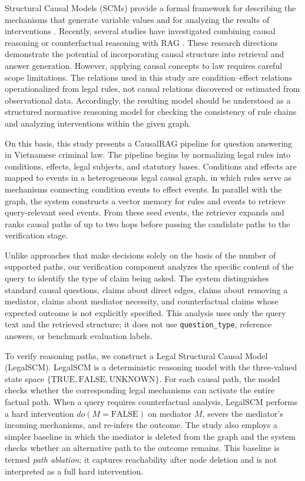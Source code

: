 Structural Causal Models (SCMs) provide a formal framework for describing
the mechanisms that generate variable values and for analyzing the results
of interventions \cite{pearl2009causality}. Recently, several studies have
investigated combining causal reasoning or counterfactual reasoning with RAG
\cite{wang2025causalrag,khadilkar2025causalcounterfactualrag,qin2026cfrag}.
These research directions demonstrate the potential of incorporating causal
structure into retrieval and answer generation. However, applying causal
concepts to law requires careful scope limitations. The relations used in
this study are condition--effect relations operationalized from legal rules,
not causal relations discovered or estimated from observational data.
Accordingly, the resulting model should be understood as a structured
normative reasoning model for checking the consistency of rule chains and
analyzing interventions within the given graph.

On this basis, this study presents a CausalRAG pipeline for question
answering in Vietnamese criminal law. The pipeline begins by normalizing
legal rules into conditions, effects, legal subjects, and statutory bases.
Conditions and effects are mapped to events in a heterogeneous legal causal
graph, in which rules serve as mechanisms connecting condition events to
effect events. In parallel with the graph, the system constructs a vector
memory for rules and events to retrieve query-relevant seed events. From
these seed events, the retriever expands and ranks causal paths of up to two
hops before passing the candidate paths to the verification stage.

Unlike approaches that make decisions solely on the basis of the number of
supported paths, our verification component analyzes the specific content
of the query to identify the type of claim being asked. The system
distinguishes standard causal questions, claims about direct edges, claims
about removing a mediator, claims about mediator necessity, and
counterfactual claims whose expected outcome is not explicitly specified.
This analysis uses only the query text and the retrieved structure; it does
not use \texttt{question\_type}, reference answers, or benchmark evaluation
labels.

To verify reasoning paths, we construct a Legal Structural Causal Model
(LegalSCM). LegalSCM is a deterministic reasoning model with the
three-valued state space
\(\{\mathrm{TRUE},\mathrm{FALSE},\mathrm{UNKNOWN}\}\). For each causal path,
the model checks whether the corresponding legal mechanisms can activate
the entire factual path. When a query requires counterfactual analysis,
LegalSCM performs a hard intervention \(do(M=\mathrm{FALSE})\) on mediator
\(M\), severs the mediator's incoming mechanisms, and re-infers the outcome.
The study also employs a simpler baseline in which the mediator is deleted
from the graph and the system checks whether an alternative path to the
outcome remains. This baseline is termed \emph{path ablation}; it captures
reachability after node deletion and is not interpreted as a full hard
intervention.

